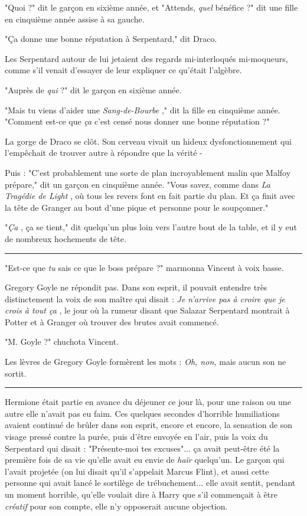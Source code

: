 "Quoi ?" dit le garçon en sixième année, et "Attends, \emph{quel}  bénéfice ?" dit une fille en cinquième année assise à sa gauche.

"Ça donne une bonne réputation à Serpentard," dit Draco.

Les Serpentard autour de lui jetaient des regards mi-interloqués mi-moqueurs, comme s'il venait d'essayer de leur expliquer ce qu'était l'algèbre.

"Auprès de \emph{qui } ?" dit le garçon en sixième année.

"Mais tu viens d'aider une \emph{Sang-de-Bourbe} ," dit la fille en cinquième année. "Comment est-ce que \emph{ça}  c'est censé nous donner une bonne réputation ?"

La gorge de Draco se clôt. Son cerveau vivait un hideux dysfonctionnement qui l'empêchait de trouver autre à répondre que la vérité -

Puis : "C'est probablement une sorte de plan incroyablement malin que Malfoy prépare," dit un garçon en cinquième année. "Vous savez, comme dans \emph{La Tragédie de Light} , où tous les revers font en fait partie du plan. Et ça finit avec la tête de Granger au bout d'une pique et personne pour le soupçonner."

"\emph{Ça} , ça se tient," dit quelqu'un plus loin vers l'autre bout de la table, et il y eut de nombreux hochements de tête.
\par\noindent\rule{\textwidth}{0.4pt}
"Est-ce que \emph{tu}  sais ce que le boss prépare ?" marmonna Vincent à voix basse.

Gregory Goyle ne répondit pas. Dans son esprit, il pouvait entendre très distinctement la voix de son maître qui disait : \emph{Je n'arrive pas à croire que je crois à tout ça} , le jour où la rumeur disant que Salazar Serpentard montrait à Potter et à Granger où trouver des brutes avait commencé.

"M. Goyle ?" chuchota Vincent.

Les lèvres de Gregory Goyle formèrent les mots : \emph{Oh, non, } mais aucun son ne sortit.
\par\noindent\rule{\textwidth}{0.4pt}
Hermione était partie en avance du déjeuner ce jour là, pour une raison ou une autre elle n'avait pas eu faim. Ces quelques secondes d'horrible humiliations avaient continué de brûler dans son esprit, encore et encore, la sensation de son visage pressé contre la purée, puis d'être envoyée en l'air, puis la voix du Serpentard qui disait : "Présente-moi tes excuses"... ça avait peut-être été la première fois de sa vie qu'elle avait eu envie de \emph{haïr}  quelqu'un. Le garçon qui l'avait projetée (on lui disait qu'il s'appelait Marcus Flint), et aussi cette personne qui avait lancé le sortilège de trébuchement... elle avait sentit, pendant un moment horrible, qu'elle voulait dire à Harry que s'il commençait à être \emph{créatif}  pour son compte, elle n'y opposerait aucune objection.


